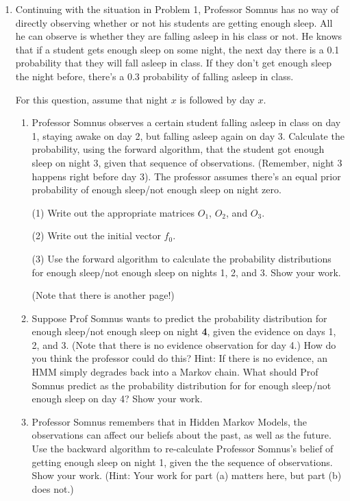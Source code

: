 \documentclass[letterpaper,11pt,english,oneside]{article}
\begin{document}
\begin{enumerate}
\item Continuing with the situation in Problem 1, Professor Somnus has no way of directly
observing whether or not his students are getting enough sleep.  All he can observe is
whether they are falling asleep in his class or not.  He knows that if a student gets
enough sleep on some night, the next day there is a 0.1 probability that they will fall 
asleep in class.  If they don't get enough sleep the night before, there's a 0.3
probability of falling asleep in class.

For this question, assume that night $x$ is followed by day $x$. 

\begin{enumerate}

\item Professor Somnus observes a certain student falling asleep in class on day 1, staying
awake on day 2, but falling asleep again on day 3.  Calculate the probability, using the forward algorithm, that the student got enough sleep on night 3, given that sequence of observations.  (Remember, night 3 happens right before day 3).  The professor assumes there's
an equal prior probability of enough sleep/not enough sleep on night zero.

(1) Write out the appropriate matrices $O_1$, $O_2$, and $O_3$.

(2) Write out the initial vector $f_0$.

(3) Use the forward algorithm to calculate the probability distributions for enough sleep/not
enough sleep on nights 1, 2, and 3.  Show your work.

(Note that there is another page!)

\item Suppose Prof Somnus wants to predict the probability distribution for enough
sleep/not enough sleep on night \textbf{4}, given the evidence on days 1, 2, and 3.  (Note that there is no evidence observation for day 4.)
How do you think the professor could do this?  Hint: If there is no evidence, an HMM simply
degrades back into a Markov chain.  What should Prof Somnus predict as the probability
distribution for for enough sleep/not
enough sleep  on day 4?  Show your work.

\item Professor Somnus remembers that in Hidden Markov Models, the observations can affect
our beliefs about the past, as well as the future.  Use the backward algorithm to re-calculate
Professor Somnus's belief of getting enough sleep on night 1, given the the
sequence of observations.  Show your work.  (Hint: Your work for part (a) matters here, but part (b) does not.)


\end{enumerate}


\end{enumerate}
\end{document}
